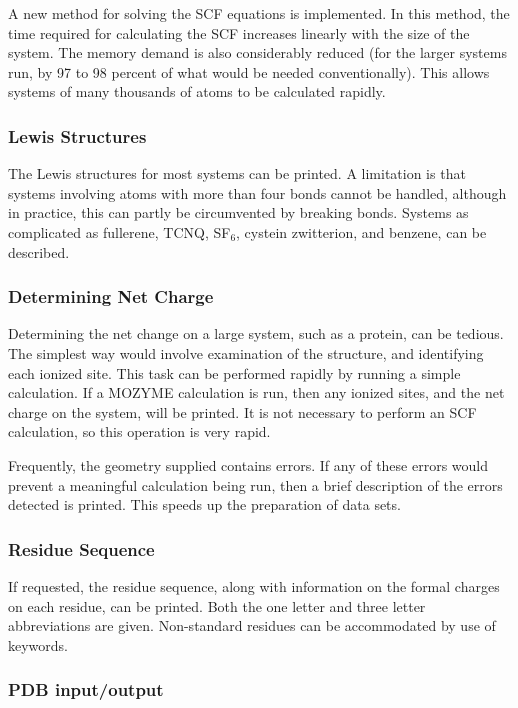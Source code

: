 A new method for solving the SCF equations is implemented.  In this method,
the time required for calculating the SCF increases linearly with the size of
the  system.  The memory demand is also considerably reduced (for the larger
systems run, by 97 to 98 percent of what would be needed conventionally). This
allows systems of many thousands of atoms to be calculated rapidly.

\subsubsection*{Lewis Structures}

The Lewis structures for most systems can be printed.  A limitation is that
systems involving atoms with more than four bonds cannot be handled, although
in practice, this can partly be circumvented by breaking bonds. Systems as
complicated as  fullerene, TCNQ, SF$_6$, cystein zwitterion, and benzene, can
be  described.

\subsubsection*{Determining Net Charge}

Determining the net change on a large system, such as a protein, can be
tedious.   The simplest way would involve examination of the structure, and
identifying  each ionized site.  This task can be performed rapidly by running
a simple  calculation.  If a MOZYME calculation is run, then any ionized sites,
and the net  charge on the system, will be printed.  It is not necessary to
perform an SCF  calculation, so this operation is very rapid.

Frequently, the geometry supplied contains errors.  If any of these errors
would  prevent a meaningful calculation being run, then a brief description of
the errors  detected is printed.  This speeds up the preparation of data sets.

\subsubsection*{Residue Sequence}

If requested, the residue sequence, along with information on the formal
charges  on each residue, can be printed.  Both the one letter and three
letter  abbreviations are given.  Non-standard residues can be accommodated by
use of  keywords.

\subsubsection*{PDB input/output}

